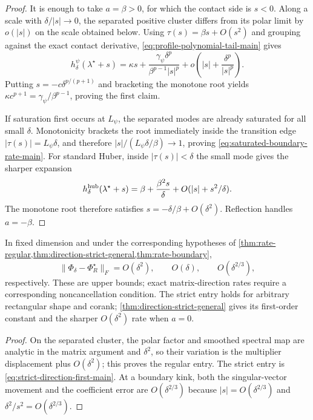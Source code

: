 \begin{proof}
It is enough to take \(a=\beta>0\), for which the contact side is \(s<0\).
Along a scale with \(\delta/|s|\to0\), the separated positive cluster differs
from its polar limit by \(o(|s|)\) on the scale obtained below.  Using
\(\tau(s)=\beta s+O(s^2)\) and grouping against the exact contact derivative,
\eqref{eq:profile-polynomial-tail-main} gives
\[
 h_{\delta}^{\psi}(\lambda^\star+s)
 =\kappa s+
 \frac{\gamma_\psi\delta^p}{\beta^{p-1}|s|^p}
 +o\!\left(|s|+\frac{\delta^p}{|s|^p}\right).
\]
Putting \(s=-c\delta^{p/(p+1)}\) and bracketing the monotone root yields
\(\kappa c^{p+1}=\gamma_\psi/\beta^{p-1}\), proving the first claim.

If saturation first occurs at \(L_\psi\), the separated modes are already
saturated for all small \(\delta\).  Monotonicity brackets the root immediately
inside the transition edge \(|\tau(s)|=L_\psi\delta\), and therefore
\(|s|/(L_\psi\delta/\beta)\to1\), proving
\eqref{eq:saturated-boundary-rate-main}.  For standard Huber, inside
\(|\tau(s)|<\delta\) the small mode gives the sharper expansion
\[
 h_\delta^{\rm hub}(\lambda^\star+s)
 =\beta+\frac{\beta^2s}{\delta}
   +O(|s|+s^2/\delta).
\]
The monotone root therefore satisfies
\(s=-\delta/\beta+O(\delta^2)\).  Reflection handles \(a=-\beta\).
\end{proof}

\begin{corollary}
\label{cor:direction-rates-main}
In fixed dimension and under the corresponding hypotheses of
\cref{thm:rate-regular,thm:direction-strict-general,thm:rate-boundary},
\begin{equation}
 \|\Phi_\delta-\Phi_R^\star\|_F
 =O(\delta^2),\qquad O(\delta),\qquad O(\delta^{2/3}),
 \label{eq:direction-rates-main}
\end{equation}
respectively.  These are upper bounds; exact matrix-direction rates require a
corresponding noncancellation condition.  The strict entry holds for arbitrary
rectangular shape and corank; \cref{thm:direction-strict-general} gives its
first-order constant and the sharper \(O(\delta^2)\) rate when \(a=0\).
\end{corollary}

\begin{proof}
On the separated cluster, the polar factor and smoothed spectral map are
analytic in the matrix argument and \(\delta^2\), so their variation is the
multiplier displacement plus \(O(\delta^2)\); this proves the regular entry.
The strict entry is \eqref{eq:strict-direction-first-main}.  At a boundary
kink, both the singular-vector movement and the coefficient
error are \(O(\delta^{2/3})\) because
\(|s|=O(\delta^{2/3})\) and
\(\delta^2/s^2=O(\delta^{2/3})\).
\end{proof}

